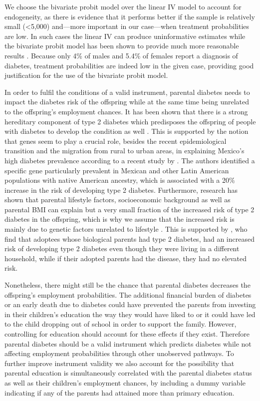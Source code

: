 We choose the bivariate probit model over the linear \ac{IV}
model to account for endogeneity, as there is evidence that it performs
better if the sample is relatively small (<5,000) and---more important
in our case---when treatment probabilities are low. In such cases
the linear \ac{IV} can produce uninformative estimates while the
bivariate probit model has been shown to provide much more reasonable
results \parencite{Chiburis2012}. Because only 4\% of males and
5.4\% of females report a diagnosis of diabetes, treatment probabilities
are indeed low in the given case, providing good justification for
the use of the bivariate probit model. 

In order to fulfil the conditions of a valid instrument,
parental diabetes needs to impact the diabetes risk of the offspring
while at the same time being unrelated to the offspring's employment
chances. It has been shown that there is a strong hereditary component
of type 2 diabetes which predisposes the offspring of people with
diabetes to develop the condition as well \parencite{Herder2011,TheInteractConsortium2013}.
This is supported by the notion that genes seem to play a crucial
role, besides the recent epidemiological transition and the migration
from rural to urban areas, in explaining Mexico's high diabetes prevalence
according to a recent study by \textcite{Williams2013}. The authors
identified a specific gene particularly prevalent in Mexican and other
Latin American populations with native American ancestry, which is
associated with a 20\% increase in the risk of developing type
2 diabetes. Furthermore, research has shown that parental lifestyle
factors, socioeconomic background as well as parental \ac{BMI} can
explain but a very small fraction of the increased risk of type 2
diabetes in the offspring, which is why we assume that the increased
risk is mainly due to genetic factors unrelated to lifestyle \parencite{Herder2011,TheInteractConsortium2013}.
This is supported by \textcite{Hemminki2010}, who find that adoptees
whose biological parents had type 2 diabetes, had an increased risk
of developing type 2 diabetes even though they were living in a different
household, while if their adopted parents had the disease, they had
no elevated risk. 

Nonetheless, there might still be the chance that parental
diabetes decreases the offspring's employment probabilities. The additional
financial burden of diabetes or an early death due to diabetes could
have prevented the parents from investing in their children's education
the way they would have liked to or it could have led to the child
dropping out of school in order to support the family. However, controlling
for education should account for these effects if they exist. Therefore
parental diabetes should be a valid instrument which predicts diabetes
while not affecting employment probabilities through other unobserved
pathways. To further improve instrument validity we also account for
the possibility that parental education is simultaneously correlated
with the parental diabetes status as well as their children's employment
chances, by including a dummy variable indicating if any of the parents
had attained more than primary education. 

